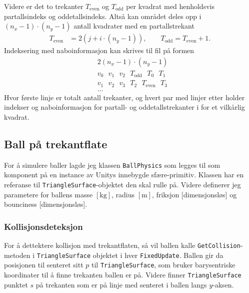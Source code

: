 \documentclass[norsk, doc, 11pt, a4paper]{apa7}  %
\begin{document}
Videre er det to trekanter \(T_{\text{even}}\) og \(T_{\text{odd}}\) per kvadrat med henholdsvis partallsindeks og oddetallsindeks.
Altså kan området deles opp i \((n_{x}-1)\cdot (n_{y}-1)\) antall kvadrater med en partallstrekant
\begin{align*}
 	T_{\text{even}} &= 2(j + i\cdot (n_{y}-1)), \qquad T_{\text{odd}} = T_{\text{even}} + 1.
\end{align*} 
Indeksering med naboinformasjon kan skrives til fil på formen
\begin{align*}
	&2(n_{x}-1)\cdot (n_{y}-1) \\
	& v_{0}\text{ } v_{1}\text{ } v_{2}\text{ } T_{\text{odd}}\text{ } T_{0}\text{ } T_{1} \\
	& v_{1}\text{ } v_{2}\text{ } v_{3}\text{ } T_{2}\text{ } T_{\text{even}}\text{ } T_{3} \\
	&...
\end{align*}
Hvor første linje er totalt antall trekanter, og hvert par med linjer etter holder indekser og naboinformasjon for partall- og oddetallstrekanter i for et vilkårlig kvadrat.

\subsection{Ball på trekantflate}
For å simulere baller lagde jeg klassen \verb+BallPhysics+ som legges til som komponent på en instance av Unitys innebygde sfære-primitiv. Klassen har en referanse til \verb+TriangleSurface+-objektet den skal rulle på. Videre definerer jeg parametere for ballens masse \([\si{\kilogram}]\), radius \([\si{\metre}]\), friksjon [dimensjonsløs] og bounciness [dimensjonsløs].

\subsubsection{Kollisjonsdeteksjon} \label{sec:3:A}
For å dettektere kollisjon med trekantflaten, så vil ballen kalle \verb+GetCollision+-metoden i \verb+TriangleSurface+ objektet i hver \verb+FixedUpdate+. Ballen gir da posisjonen til senteret sitt \(p\) til \verb+TriangleSurface+, som bruker barysentriske koordinater til å finne trekanten ballen er på. Videre finner \verb+TriangleSurface+ punktet \(s\) på trekanten som er på linje med senteret i ballen langs \(y\)-aksen.
\end{document}
